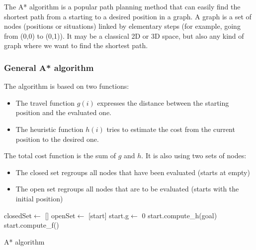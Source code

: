 \documentclass{ecnreport}
\begin{document}
 The A* algorithm is a popular path planning method that can easily find the shortest path from a starting to a desired position in a graph. 
 A graph is a set of nodes (positions or situations) linked by elementary steps (for example, going from (0,0) to (0,1)). It may be a classical 2D or 3D space, but
 also any kind of graph where we want to find the shortest path. 
 
 \begin{itemize}
 \end{itemize}
 
 \subsubsection{General A* algorithm}
 The algorithm is based on two functions:
 \begin{itemize}
  \item The travel function $g(i)$ expresses the distance between the starting position and the evaluated one. 
  \item The heuristic function $h(i)$ tries to estimate the cost from the current position to the desired one. 
 \end{itemize}The total cost function is the sum of $g$ and $h$.
It is also using two sets of nodes:
\begin{itemize}
 \item The closed set regroups all nodes that have been evaluated (starts at empty)
 \item The open set regroups all nodes that are to be evaluated (starts with the initial position)
\end{itemize}


\begin{algorithm}[!t]
{}
closedSet$\gets$ []\;
openSet$\gets$ [start]\;
start.g$\gets$ 0\;
start.compute\_h(goal)\;
start.compute\_f()\;
\caption{A* algorithm}
\label{algo:smallpoly}
\end{algorithm}
\end{document}
